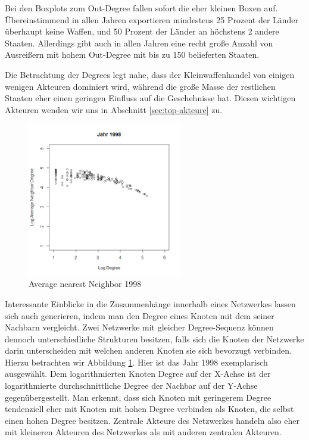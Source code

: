\documentclass[a4paper,ngerman,oneside,titlepage,bibliography=totoc,11pt]{scrreprt}
\begin{document}
Bei den Boxplots zum Out-Degree fallen sofort die eher kleinen Boxen auf. Übereinstimmend in allen Jahren exportieren mindestens 25 Prozent der Länder überhaupt keine Waffen, und 50 Prozent der Länder an höchstens 2 andere Staaten. Allerdings gibt auch in allen Jahren eine recht große Anzahl von Ausreißern mit hohem Out-Degree mit bis zu 150 belieferten Staaten. 

Die Betrachtung der Degrees legt nahe, dass der Kleinwaffenhandel von einigen wenigen Akteuren dominiert wird, während die große Masse der restlichen Staaten eher einen geringen Einfluss auf die Geschehnisse hat. Diesen wichtigen Akteuren wenden wir uns in Abschnitt \ref{sec:top-akteure} zu.


\begin{figure}[htbp]
	\centering
		\includegraphics[width=0.60\textwidth]{Grafiken/and.png}
	\caption{Average nearest Neighbor 1998}
	\label{fig:and}
\end{figure}

Interessante Einblicke in die Zusammenhänge innerhalb eines Netzwerkes lassen sich auch generieren, indem man den Degree eines Knoten mit dem seiner Nachbarn vergleicht. Zwei Netzwerke mit gleicher Degree-Sequenz können dennoch unterschiedliche Strukturen besitzen, falls sich die Knoten der Netzwerke darin unterscheiden mit welchen anderen Knoten sie sich bevorzugt verbinden. Hierzu betrachten wir Abbildung \ref{fig:and}. Hier ist das Jahr 1998 exemplarisch ausgewählt. Dem logarithmierten Knoten Degree auf der X-Achse ist der logarithmierte durchschnittliche Degree der Nachbar auf der Y-Achse gegenübergestellt. Man erkennt, dass sich Knoten mit geringerem Degree tendenziell eher mit Knoten mit hohen Degree verbinden als Knoten, die selbst einen hohen Degree besitzen. Zentrale Akteure des Netzwerkes handeln also eher mit kleineren Akteuren des Netzwerkes als mit anderen zentralen Akteuren.
\end{document}
